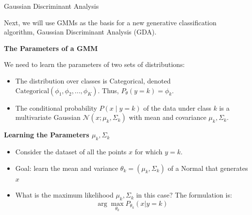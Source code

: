 \documentclass[../../main.tex]{subfiles}
\begin{document}
\begin{frame}[fragile]{Gaussian Discriminant Analysis}

Next, we will use GMMs as the basis for a new generative classification algorithm, Gaussian Discriminant Analysis (GDA).
\vspace{0.3cm}

\textbf{The Parameters of a GMM}

We need to learn the parameters of two sets of distributions:
\begin{itemize}
    \item The distribution over classes is Categorical, denoted $\text{Categorical}(\phi_1, \phi_2, ..., \phi_K)$. Thus, $P_\theta(y=k) = \phi_k$.
    \item The conditional probability $P(x\mid y=k)$ of the data under class $k$ is a multivariate Gaussian $\mathcal{N}(x; \mu_k, \Sigma_k)$ with mean and covariance $\mu_k, \Sigma_k$.
\end{itemize}

\vspace{0.3cm}
\textbf{Learning the Parameters $\mu_k, \Sigma_k$}

\begin{itemize}
    \item Consider the dataset of all the points $x$ for which $y=k$.
    \item Goal: learn the mean and variance $\theta_k=(\mu_k, \Sigma_k)$ of a Normal that generates $x$
    \item What is the maximum likelihood $\mu_k, \Sigma_k$ in this case? The formulation is: $$\arg\max_{\theta_k} P_{\theta_k}(x|y=k)$$
\end{itemize}
\end{frame}
\end{document}
